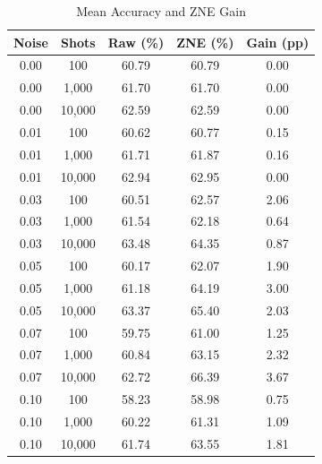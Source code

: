 \documentclass[conference]{IEEEtran}
\begin{document}
\begin{table}[H]
\caption{Mean Accuracy and ZNE Gain}
\label{tab:zne_mean_gain}
\centering
\scriptsize
\renewcommand{\arraystretch}{1.35}
\setlength{\tabcolsep}{12pt}
\begin{tabular}{|c|c|c|c|c|}
\hline
\textbf{Noise} & \textbf{Shots} & \textbf{Raw (\%)} & \textbf{ZNE (\%)} & \textbf{Gain (pp)} \\
\hline
0.00 & 100    & 60.79 & 60.79 & 0.00 \\
\hline
0.00 & 1,000  & 61.70 & 61.70 & 0.00 \\
\hline
0.00 & 10,000 & 62.59 & 62.59 & 0.00 \\
\hline
0.01 & 100    & 60.62 & 60.77 & 0.15 \\
\hline
0.01 & 1,000  & 61.71 & 61.87 & 0.16 \\
\hline
0.01 & 10,000 & 62.94 & 62.95 & 0.00 \\
\hline
0.03 & 100    & 60.51 & 62.57 & 2.06 \\
\hline
0.03 & 1,000  & 61.54 & 62.18 & 0.64 \\
\hline
0.03 & 10,000 & 63.48 & 64.35 & 0.87 \\
\hline
0.05 & 100    & 60.17 & 62.07 & 1.90 \\
\hline
0.05 & 1,000  & 61.18 & 64.19 & 3.00 \\
\hline
0.05 & 10,000 & 63.37 & 65.40 & 2.03 \\
\hline
0.07 & 100    & 59.75 & 61.00 & 1.25 \\
\hline
0.07 & 1,000  & 60.84 & 63.15 & 2.32 \\
\hline
0.07 & 10,000 & 62.72 & 66.39 & 3.67 \\
\hline
0.10 & 100    & 58.23 & 58.98 & 0.75 \\
\hline
0.10 & 1,000  & 60.22 & 61.31 & 1.09 \\
\hline
0.10 & 10,000 & 61.74 & 63.55 & 1.81 \\
\hline
\end{tabular}
\end{table}
\end{document}
